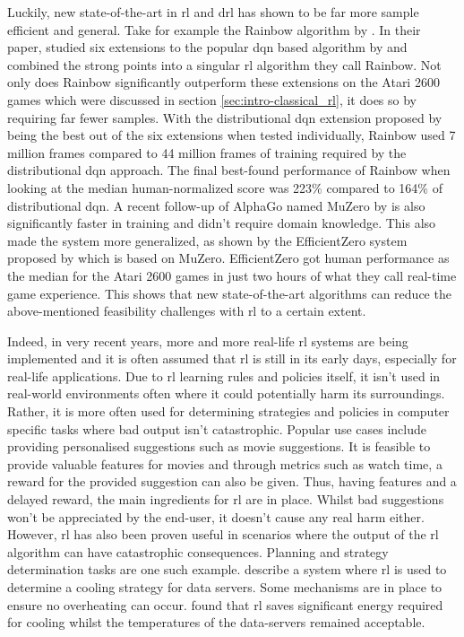 Luckily, new state-of-the-art in \gls{rl} and \gls{drl} has shown to be far more sample efficient and general.
Take for example the Rainbow algorithm by \citet{rainbow}.
In their paper, \citet{rainbow} studied six extensions to the popular \gls{dqn} based algorithm by  and combined the strong points into a singular \gls{rl} algorithm they call Rainbow.
Not only does Rainbow significantly outperform these extensions on the Atari 2600 games which were discussed in section \ref{sec:intro-classical_rl}, it does so by requiring far fewer samples.
With the distributional \gls{dqn} extension proposed by \citet{distributional_dqn} being the best out of the six extensions when tested individually, Rainbow used 7 million frames compared to 44 million frames of training required by the distributional \gls{dqn} approach.
The final best-found performance of Rainbow when looking at the median human-normalized score was 223\% compared to 164\% of distributional \gls{dqn}.
A recent follow-up of AlphaGo named MuZero by \citet{muzero} is also significantly faster in training and didn't require domain knowledge.
This also made the system more generalized, as shown by the EfficientZero system proposed by \citet{efficient_zero} which is based on MuZero. EfficientZero got human performance as the median for the Atari 2600 games in just two hours of what they call real-time game experience.
This shows that new state-of-the-art algorithms can reduce the above-mentioned feasibility challenges with \gls{rl} to a certain extent.

Indeed, in very recent years, more and more real-life \gls{rl} systems are being implemented and it is often assumed that \gls{rl} is still in its early days, especially for real-life applications.
Due to \gls{rl} learning rules and policies itself, it isn't used in real-world environments often where it could potentially harm its surroundings.
Rather, it is more often used for determining strategies and policies in computer specific tasks where bad output isn't catastrophic.
Popular use cases include providing personalised suggestions such as movie suggestions.
It is feasible to provide valuable features for movies and through metrics such as watch time, a reward for the provided suggestion can also be given.
Thus, having features and a delayed reward, the main ingredients for \gls{rl} are in place.
Whilst bad suggestions won't be appreciated by the end-user, it doesn't cause any real harm either.
However, \Gls{rl} has also been proven useful in scenarios where the output of the \gls{rl} algorithm can have catastrophic consequences.
Planning and strategy determination tasks are one such example.
 describe a system where \gls{rl} is used to determine a cooling strategy for data servers.
Some mechanisms are in place to ensure no overheating can occur.
 found that \gls{rl} saves significant energy required for cooling whilst the temperatures of the data-servers remained acceptable. 

